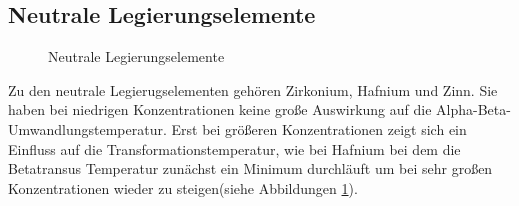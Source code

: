 \documentclass[a4paper, 11pt]{tubsreprt}
\begin{document}
\subsection{Neutrale Legierungselemente}
\begin{figure}
\caption{Neutrale Legierungselemente}
\label{Abbildung neutrale legierungselemente}
\end{figure}

Zu den neutrale Legierugselementen gehören Zirkonium, Hafnium und Zinn. Sie haben bei niedrigen Konzentrationen keine große Auswirkung auf die Alpha-Beta-Umwandlungstemperatur. Erst bei größeren Konzentrationen zeigt sich ein Einfluss auf die Transformationstemperatur, wie bei Hafnium bei dem die Betatransus Temperatur zunächst ein Minimum durchläuft um bei sehr großen Konzentrationen wieder zu steigen(siehe Abbildungen \ref{Abbildung neutrale legierungselemente}).
\end{document}
